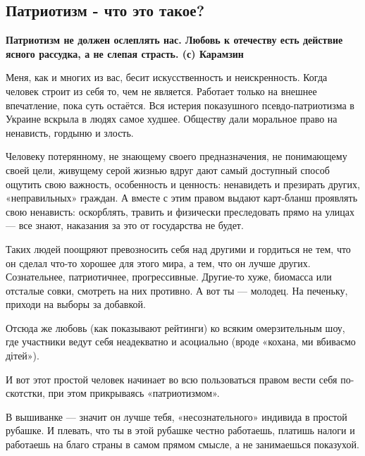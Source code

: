  
 
 

\subsection{Патриотизм - что это такое?}
\label{sec:02_11_2020.fb.ekaterina_zharkih.1.patriotism}


\textbf{Патриотизм не должен ослеплять нас. Любовь к отечеству есть действие ясного рассудка, а не слепая страсть.
(с) Карамзин}

Меня, как и многих из вас, бесит искусственность и неискренность. Когда человек
строит из себя то, чем не является. Работает только на внешнее впечатление,
пока суть остаётся.  Вся истерия показушного псевдо-патриотизма в Украине
вскрыла в людях самое худшее. Обществу дали моральное право на ненависть,
гордыню и злость.

Человеку потерянному, не знающему своего предназначения, не понимающему своей
цели, живущему серой жизнью вдруг дают самый доступный способ ощутить свою
важность, особенность и ценность: ненавидеть и презирать других, «неправильных»
граждан. А вместе с этим правом выдают карт-бланш проявлять свою ненависть:
оскорблять, травить и физически преследовать прямо на улицах --- все знают,
наказания за это от государства не будет. 

Таких людей поощряют превозносить себя над другими и гордиться не тем, что он
сделал что-то хорошее для этого мира, а тем, что он лучше других. Сознательнее,
патриотичнее, прогрессивные. Другие-то хуже, биомасса или отсталые совки,
смотреть на них противно. А вот ты --- молодец. На печеньку, приходи на выборы за
добавкой. 

Отсюда же любовь (как показывают рейтинги) ко всяким омерзительным шоу, где
участники ведут себя неадекватно и асоциально (вроде «кохана, ми вбиваємо
дітей»). 

И вот этот простой человек начинает во всю пользоваться правом вести себя
по-скотстки, при этом прикрываясь «патриотизмом».

В вышиванке --- значит он лучше тебя, «несознательного» индивида в простой
рубашке. И плевать, что ты в этой рубашке честно работаешь, платишь налоги и
работаешь на благо страны в самом прямом смысле, а не занимаешься показухой. 


